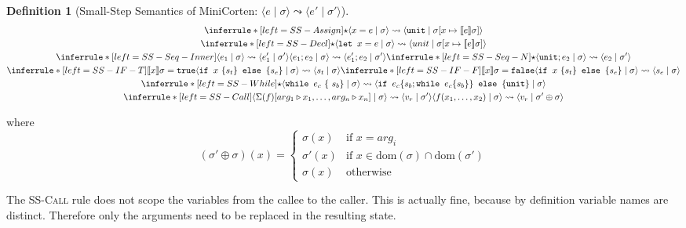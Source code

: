 \documentclass{book}
\newcommand{\code}[1]{\texttt{#1}}
\newcommand{\tuple}[2]{\langle #1 \mid #2 \rangle}
\newcommand{\bbracket}[1]{\llbracket #1 \rrbracket}
\theoremstyle{definition}
\newtheorem{definition}[theorem]{Definition}
\begin{document}
\begin{definition}[Small-Step Semantics of MiniCorten: $\tuple{e}{\sigma} \leadsto \tuple{e'}{\sigma'}$]

\begin{gather*}
  \inferrule*[left=SS-Assign]
    {\star}
    {\tuple{x = e }{ \sigma } \leadsto \tuple{\code{unit} }{ \sigma[x \mapsto \bbracket{e}\sigma]}}
  \\
  \inferrule*[left=SS-Decl]
    {\star}
    {\tuple{\code{let } x = e}{\sigma} \leadsto \tuple{unit}{\sigma[ x \mapsto \bbracket{e}\sigma]}}
  \\
  \inferrule*[left=SS-Seq-Inner]
      {\tuple{e_1 }{ \sigma } \leadsto \tuple{e_1' }{ \sigma'}}
      {\tuple{e_1; e_2 }{ \sigma } \leadsto \tuple{e_1'; e_2 }{ \sigma'}}
  \inferrule*[left=SS-Seq-N]
    {\star}
    {\tuple{\code{unit}; e_2 }{ \sigma } \leadsto \tuple{e_2 }{ \sigma'}}
  \\
  \inferrule*[left=SS-IF-T]
    {\bbracket{x} \sigma = \code{true}}
    {\tuple{\code{if } x\ \{ s_t \} \code { else } \{ s_e \} }{\sigma} \leadsto \tuple{s_t}{\sigma}}
  \inferrule*[left=SS-IF-F]
    {\bbracket{x}\sigma = \code{false}}
    {\tuple{\code{if } x\ \{ s_t \} \code { else } \{ s_e \} }{\sigma} \leadsto \tuple{s_e}{\sigma}}
  \\
  \inferrule*[left=SS-While]
    {\star}
    {
      \tuple{ \code{while } e_c\ \{\ s_b \}}{\sigma}
      \leadsto
      \tuple{ \code{if } e_c \{ s_b;  \code{while } e_c \{ s_b \} \} { \code{ else } } \{ \code{unit} \} }{\sigma}
    }
  \\
  \inferrule*[left=SS-Call]
    {\tuple{\Sigma(f)[arg_1 \triangleright x_1, \dots, arg_n \triangleright x_n]}{\sigma} \leadsto \tuple{v_r}{\sigma'} }
    {\tuple{f(x_1, \dots, x_2)}{\sigma} \leadsto \tuple{v_r}{\sigma' \oplus \sigma}}
\end{gather*}

where $$(\sigma' \oplus \sigma)(x) =
  \begin{cases}
    \sigma(x) & \text{if } x = arg_i \\
    \sigma'(x) & \text{if } x \in \text{dom}(\sigma) \cap \text{dom}(\sigma')\\
    \sigma(x) & \text{otherwise }
  \end{cases}$$
\end{definition}

The \textsc{SS-Call} rule does not scope the variables from the callee to the caller. This is actually fine, because by definition variable names are distinct. Therefore only the arguments need to be replaced in the resulting state.
\end{document}
